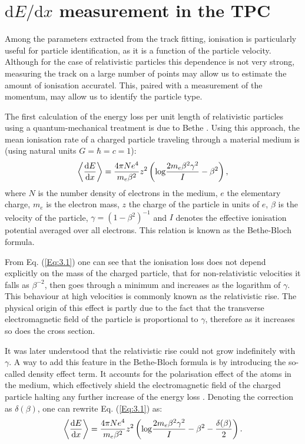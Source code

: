 \section[\texorpdfstring{$\mathrm{d}E/\mathrm{d}x$}{dE/dx} measurement in the TPC]{\boldmath\texorpdfstring{$\mathrm{d}E/\mathrm{d}x$}{dE/dx} measurement in the TPC}\label{section:dEdx}

Among the parameters extracted from the track fitting, ionisation is particularly useful for particle identification, as it is a function of the particle velocity. Although for the case of relativistic particles this dependence is not very strong, measuring the track on a large number of points may allow us to estimate the amount of ionisation accuratel. This, paired with a measurement of the momentum, may allow us to identify the particle type.

The first calculation of the energy loss per unit length of relativistic particles using a quantum-mechanical treatment is due to Bethe \cite{Bethe1930}. Using this approach, the mean ionisation rate of a charged particle traveling through a material medium is (using natural units $G=\hbar=c=1$):
\begin{equation}\label{Eq:3.1}
    \expval{\frac{\mathrm{d}E}{\mathrm{d}x}} = \frac{4 \pi N e^{4}}{m_{e}\beta^{2}} z^{2} \left(\mathrm{log} \frac{2m_{e}\beta^{2}\gamma^{2}}{I} - \beta^{2}\right),
\end{equation}
where $N$ is the number density of electrons in the medium, $e$ the elementary charge, $m_{e}$ is the electron mass, $z$ the charge of the particle in units of $e$, $\beta$ is the velocity of the particle, $\gamma = (1-\beta^{2})^{-1}$ and $I$ denotes the effective ionisation potential averaged over all electrons. This relation is known as the Bethe-Bloch formula.

From Eq. (\ref{Eq:3.1}) one can see that the ionisation loss does not depend explicitly on the mass of the charged particle, that for non-relativistic velocities it falls as $\beta^{-2}$, then goes through a minimum and increases as the logarithm of $\gamma$. This behaviour at high velocities is commonly known as the relativistic rise. The physical origin of this effect is partly due to the fact that the transverse electromagnetic field of the particle is proportional to $\gamma$, therefore as it increases so does the cross section.

It was later understood that the relativistic rise could not grow indefinitely with $\gamma$. A way to add this feature in the Bethe-Bloch formula is by introducing the so-called density effect term. It accounts for the polarisation effect of the atoms in the medium, which effectively shield the electromagnetic field of the charged particle halting any further increase of the energy loss \cite{Fermi1940}. Denoting the correction as $\delta(\beta)$, one can rewrite Eq. (\ref{Eq:3.1}) as:
\begin{equation}\label{Eq:3.2}
    \expval{\frac{\mathrm{d}E}{\mathrm{d}x}} = \frac{4 \pi N e^{4}}{m_{e}\beta^{2}} z^{2} \left(\mathrm{log} \frac{2m_{e}\beta^{2}\gamma^{2}}{I} - \beta^{2}-\frac{\delta(\beta)}{2}\right).
\end{equation}

